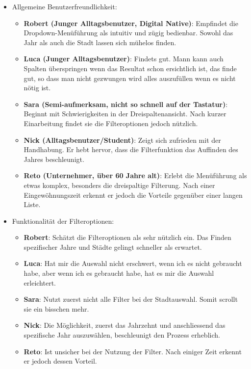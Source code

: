 \begin{itemize}
    \item Allgemeine Benutzerfreundlichkeit: 
    \begin{itemize}
        \item \textbf{Robert (Junger Alltagsbenutzer, Digital Native)}: 
              Empfindet die Drop\-down-Menü\-führung als intuitiv und zügig bedienbar. 
              Sowohl das Jahr als auch die Stadt lassen sich mühelos finden.
        \item \textbf{Luca (Junger Alltagsbenutzer)}:
Findets gut. Mann kann auch Spalten überspringen wenn das Resultat schon ersichtlich ist, das finde gut, so dass man nicht gezwungen wird alles auszufüllen wenn es nicht nötig ist.
\item \textbf{Sara (Semi-aufmerksam, nicht so schnell auf der Tastatur)}:
              Beginnt mit Schwierigkeiten in der Dreispaltenansicht. 
              Nach kurzer Einarbeitung findet sie die Filteroptionen jedoch nützlich. 
        \item \textbf{Nick (Alltagsbenutzer/Student)}: 
              Zeigt sich zufrieden mit der Handhabung. 
              Er hebt hervor, dass die Filterfunktion das Auffinden des Jahres beschleunigt. 
        \item \textbf{Reto (Unternehmer, über 60 Jahre alt)}: 
              Erlebt die Menüführung als etwas komplex, besonders die dreispaltige Filterung. 
              Nach einer Eingewöhnungszeit erkennt er jedoch die Vorteile gegenüber einer langen Liste. 
    \end{itemize}
    \item Funktionalität der Filteroptionen: 
    \begin{itemize}
        \item \textbf{Robert}:
              Schätzt die Filteroptionen als sehr nützlich ein.
              Das Finden spezifischer Jahre und Städte gelingt schneller als erwartet.
\item \textbf{Luca}:
Hat mir die Auswahl nicht erschwert, wenn ich es nicht gebraucht habe, aber wenn ich es gebraucht habe, hat es mir die Auswahl erleichtert.
        \item \textbf{Sara}: 
              Nutzt zuerst nicht alle Filter bei der Stadtauswahl. 
              Somit scrollt sie ein bisschen mehr. 
        \item \textbf{Nick}: 
              Die Möglichkeit, zuerst das Jahrzehnt und anschliessend das spezifische Jahr auszuwählen, beschleunigt den Prozess erheblich. 
        \item \textbf{Reto}: 
              Ist unsicher bei der Nutzung der Filter. 
              Nach einiger Zeit erkennt er jedoch dessen Vorteil. 
    \end{itemize}
\end{itemize}

